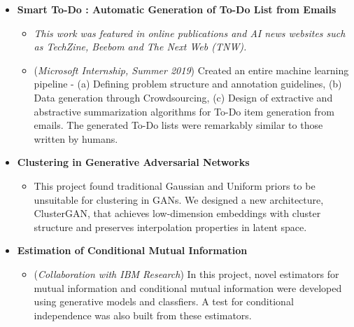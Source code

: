 \documentclass[margin,line]{resume}
\begin{document}
\begin{resume}
\begin{itemize}
\item \textbf{Smart To-Do : Automatic Generation of To-Do List from Emails}
\begin{itemize}
\item \textit{This work was featured in online publications and AI news websites such as TechZine, Beebom and The Next Web (TNW).}
\item (\textit{Microsoft Internship, Summer 2019}) Created an entire machine learning pipeline - (a) Defining problem structure and annotation guidelines, (b) Data generation through Crowdsourcing, (c) Design of extractive and abstractive summarization algorithms for To-Do item generation from emails. The generated To-Do lists were remarkably similar to those written by humans. 

\end{itemize}

\item \textbf{Clustering in Generative Adversarial Networks}
\begin{itemize}  
\vspace{-0.5pt}
\item This project found traditional Gaussian and Uniform priors to be unsuitable for clustering in GANs. We designed a new architecture, ClusterGAN, that achieves low-dimension embeddings with cluster structure and preserves interpolation properties in latent space.
\end{itemize}


\item \textbf{Estimation of Conditional Mutual Information}
\begin{itemize} 
\vspace{-0.5pt}
\item (\textit{Collaboration with IBM Research}) In this project, novel estimators for mutual information and conditional mutual information were developed using generative models and classfiers. A test for conditional independence was also built from these estimators.
\end{itemize}







\end{itemize}
\end{resume}
\end{document}
